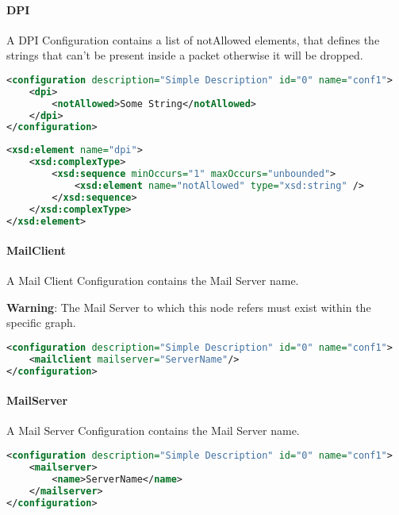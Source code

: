 \paragraph{DPI}

A DPI Configuration contains a list of notAllowed elements, that defines the strings that can’t be present inside a packet otherwise it will be dropped.

\begin{lstlisting}[language=XML, caption=DPI Configuration Example]
<configuration description="Simple Description" id="0" name="conf1">
    <dpi>
        <notAllowed>Some String</notAllowed>
    </dpi>
</configuration>
\end{lstlisting}

\begin{lstlisting}[language=XML, caption=DPI schema code snippet]
<xsd:element name="dpi">
    <xsd:complexType>
        <xsd:sequence minOccurs="1" maxOccurs="unbounded">
            <xsd:element name="notAllowed" type="xsd:string" />
        </xsd:sequence>
    </xsd:complexType>
</xsd:element>
\end{lstlisting}

\paragraph{MailClient}

A Mail Client Configuration contains the Mail Server name.

\begin{warning}
\textbf{Warning}: The Mail Server to which this node refers must exist within the specific graph.
\end{warning}

\begin{lstlisting}[language=XML, caption=MailClient Configuration Example]
<configuration description="Simple Description" id="0" name="conf1">
    <mailclient mailserver="ServerName"/>
</configuration>
\end{lstlisting}

\paragraph{MailServer}

A Mail Server Configuration contains the Mail Server name.

\begin{lstlisting}[language=XML, caption=MailServer Configuration Example]
<configuration description="Simple Description" id="0" name="conf1">
    <mailserver>
    	<name>ServerName</name>
    </mailserver>
</configuration>
\end{lstlisting}

